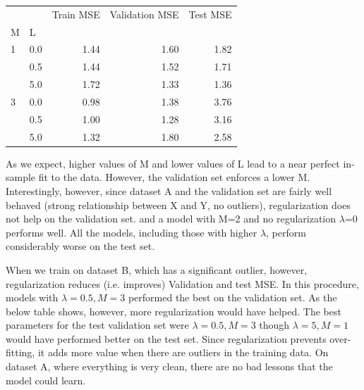\documentclass[10pt]{article}
\begin{document}
\begin{tabular}{llrrr}
\toprule
  &     &  Train MSE &  Validation MSE &  Test MSE \\
M & L &            &                 &           \\
\midrule
1 & 0.0 &       1.44 &            1.60 &      1.82 \\
  & 0.5 &       1.44 &            1.52 &      1.71 \\
  & 5.0 &       1.72 &            1.33 &      1.36 \\
3 & 0.0 &       0.98 &            1.38 &      3.76 \\
  & 0.5 &       1.00 &            1.28 &      3.16 \\
  & 5.0 &       1.32 &            1.80 &      2.58 \\
\bottomrule
\end{tabular}
As we expect, higher values of M and lower values of L lead to a near perfect in-sample fit to the data. However, the validation set enforces a lower M. Interestingly, however, since dataset A and the validation set are fairly well behaved (strong relationship between X and Y, no outliers), regularization does not help on the validation set. and a model with M=2 and no regularization $\lambda$=0 performs well. All the models, including those with higher $\lambda$, perform considerably worse on the test set. 

When we train on dataset B, which has a significant outlier, however, regularization reduces (i.e. improves) Validation and test MSE. In this procedure, models with  $\lambda = 0.5, M=3$ performed the best on the validation set. As the below table shows, however, more regularization would have helped. The best parameters for the test validation set  were  $\lambda = 0.5, M=3$  though $\lambda = 5, M=1$ would have performed better on the test set.  Since regularization prevents over-fitting, it adds more value when there are outliers in the training data. On dataset A, where everything is very clean, there are no bad lessons that the model could learn. 
\end{document}
